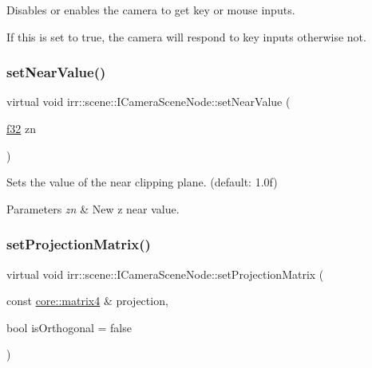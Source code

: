 Disables or enables the camera to get key or mouse inputs. 

If this is set to true, the camera will respond to key inputs otherwise not. \mbox{\label{classirr_1_1scene_1_1ICameraSceneNode_aab5107ae5d0373d6fb005a87741e7057}} 
\subsubsection{\texorpdfstring{set\+Near\+Value()}{setNearValue()}}
{\footnotesize\ttfamily virtual void irr\+::scene\+::\+I\+Camera\+Scene\+Node\+::set\+Near\+Value (\begin{DoxyParamCaption}\item[{\hyperlink{namespaceirr_a0277be98d67dc26ff93b1a6a1d086b07}{f32}}]{zn }\end{DoxyParamCaption})\hspace{0.3cm}{\ttfamily [pure virtual]}}



Sets the value of the near clipping plane. (default\+: 1.\+0f) 


\begin{DoxyParams}{Parameters}
{\em zn} & New z near value. \\
\hline
\end{DoxyParams}
\mbox{\label{classirr_1_1scene_1_1ICameraSceneNode_a022415e06070ad77c6053eba64ba62ae}} 
\subsubsection{\texorpdfstring{set\+Projection\+Matrix()}{setProjectionMatrix()}}
{\footnotesize\ttfamily virtual void irr\+::scene\+::\+I\+Camera\+Scene\+Node\+::set\+Projection\+Matrix (\begin{DoxyParamCaption}\item[{const \hyperlink{namespaceirr_1_1core_a73fa92e638c5ca97efd72da307cc9b65}{core\+::matrix4} \&}]{projection,  }\item[{bool}]{is\+Orthogonal = {\ttfamily false} }\end{DoxyParamCaption})\hspace{0.3cm}{\ttfamily [pure virtual]}}



